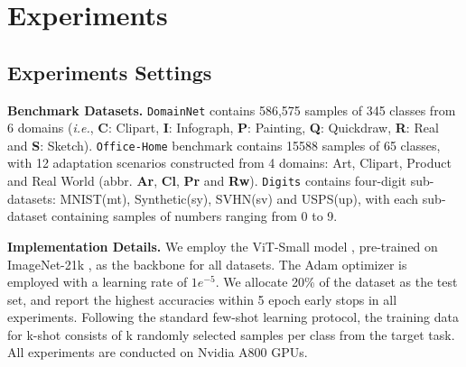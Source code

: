 
\section{Experiments}
\label{sec:experi}




\subsection{Experiments Settings}
\textbf{Benchmark Datasets.} 
\texttt{DomainNet} contains 586,575 samples of 345 classes from 6 domains (\textit{i.e.}, \textbf{C}: Clipart, \textbf{I}: Infograph, \textbf{P}: Painting, \textbf{Q}: Quickdraw, \textbf{R}: Real and \textbf{S}: Sketch). \texttt{Office-Home} benchmark contains 15588 samples of 65 classes, with 12 adaptation scenarios constructed from 4 domains:  Art, Clipart, Product and Real World (abbr. \textbf{Ar}, \textbf{Cl}, \textbf{Pr} and \textbf{Rw}). 
\texttt{Digits} contains four-digit sub-datasets: MNIST(mt), Synthetic(sy), SVHN(sv) and USPS(up), with each sub-dataset containing samples of numbers ranging from 0 to 9.


\textbf{Implementation Details.} We employ the ViT-Small model \cite{rw2019timm_vits}, pre-trained on ImageNet-21k \cite{deng2009imagenet}, as the backbone for all datasets. The Adam optimizer is employed with a learning rate of $1e^{-5}$. We allocate 20\% of the dataset as the test set, and report the highest accuracies within 5 epoch early stops in all experiments. Following the standard few-shot learning protocol, the training data for k-shot consists of k randomly selected samples per class from the target task. All experiments are conducted on Nvidia A800 GPUs.

